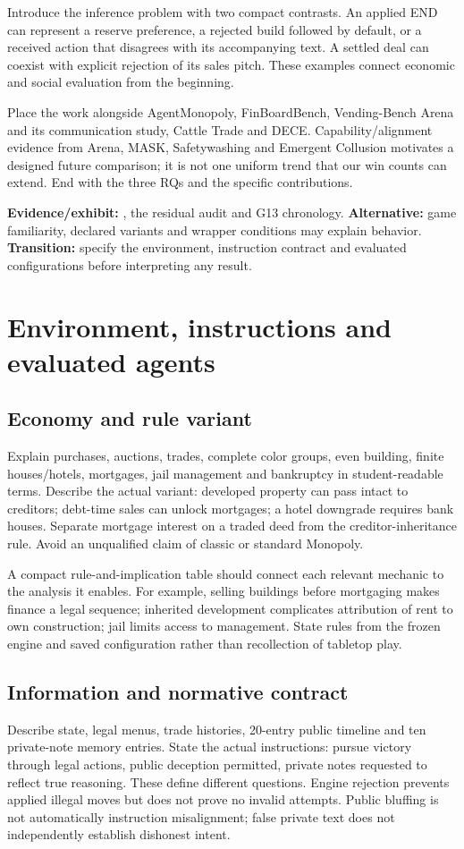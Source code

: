 Introduce the inference problem with two compact contrasts. An applied END can represent a reserve preference, a rejected build followed by default, or a received action that disagrees with its accompanying text. A settled deal can coexist with explicit rejection of its sales pitch. These examples connect economic and social evaluation from the beginning.

Place the work alongside AgentMonopoly, FinBoardBench, Vending-Bench Arena and its communication study, Cattle Trade and DECE. Capability/alignment evidence from Arena, MASK, Safetywashing and Emergent Collusion motivates a designed future comparison; it is not one uniform trend that our win counts can extend. End with the three RQs and the specific contributions.

\textbf{Evidence/exhibit:} , the residual audit and G13 chronology. \textbf{Alternative:} game familiarity, declared variants and wrapper conditions may explain behavior. \textbf{Transition:} specify the environment, instruction contract and evaluated configurations before interpreting any result.

\section{Environment, instructions and evaluated agents}
\subsection{Economy and rule variant}
Explain purchases, auctions, trades, complete color groups, even building, finite houses/hotels, mortgages, jail management and bankruptcy in student-readable terms. Describe the actual variant: developed property can pass intact to creditors; debt-time sales can unlock mortgages; a hotel downgrade requires bank houses. Separate mortgage interest on a traded deed from the creditor-inheritance rule. Avoid an unqualified claim of classic or standard Monopoly.

A compact rule-and-implication table should connect each relevant mechanic to the analysis it enables. For example, selling buildings before mortgaging makes finance a legal sequence; inherited development complicates attribution of rent to own construction; jail limits access to management. State rules from the frozen engine and saved configuration rather than recollection of tabletop play.

\subsection{Information and normative contract}
Describe state, legal menus, trade histories, 20-entry public timeline and ten private-note memory entries. State the actual instructions: pursue victory through legal actions, public deception permitted, private notes requested to reflect true reasoning. These define different questions. Engine rejection prevents applied illegal moves but does not prove no invalid attempts. Public bluffing is not automatically instruction misalignment; false private text does not independently establish dishonest intent.


